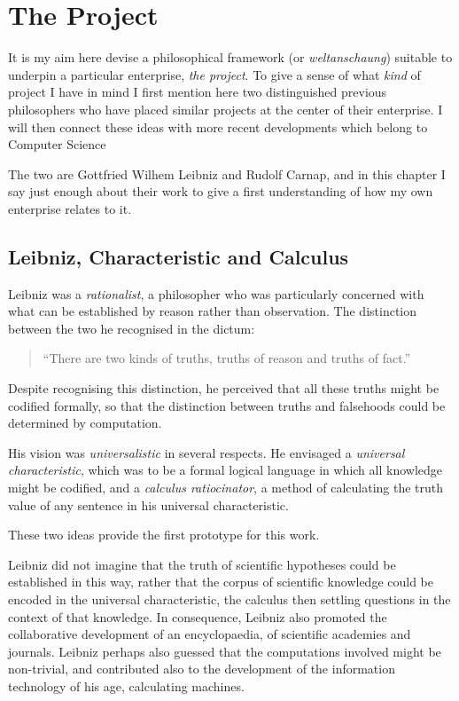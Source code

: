 \def\rbjidtheproject{$$Id: theproject.tex,v 1.1 2011/10/25 09:10:45 rbj Exp $$}

\section{The Project}\label{TheProject}

It is my aim here devise a philosophical framework (or \emph{weltanschaung}) suitable to underpin a particular enterprise, \emph{the project}.
To give a sense of what \emph{kind} of project I have in mind I first mention here two distinguished previous philosophers who have placed similar projects at the center of their enterprise.
I will then connect these ideas with more recent developments which belong to Computer Science


The two are Gottfried Wilhem Leibniz and Rudolf Carnap, and in this chapter I say just enough about their work to give a first understanding of how my own enterprise relates to it.

\subsection{Leibniz, Characteristic and Calculus}

Leibniz was a \emph{rationalist}, a philosopher who was particularly concerned with what can be established by reason rather than observation.
The distinction between the two he recognised in the dictum:

\begin{quote}
``There are two kinds of truths, truths of reason and truths of fact.''
\end{quote}

Despite recognising this distinction, he perceived that all these truths might be codified formally, so that the distinction between truths and falsehoods could be determined by computation.

His vision was \emph{universalistic} in several respects.
He envisaged a \emph{universal characteristic}, which was to be a formal logical language in which all knowledge might be codified, and a \emph{calculus ratiocinator}, a method of calculating the truth value of any sentence in his universal characteristic.

These two ideas provide the first prototype for this work.

Leibniz did not imagine that the truth of scientific hypotheses could be established in this way, rather that the corpus of scientific knowledge could be encoded in the universal characteristic, the calculus then settling questions in the context of that knowledge.
In consequence, Leibniz also promoted the collaborative development of an encyclopaedia, of scientific academies and journals.
Leibniz perhaps also guessed that the computations involved might be non-trivial, and contributed also to the development of the information technology of his age, calculating machines.

